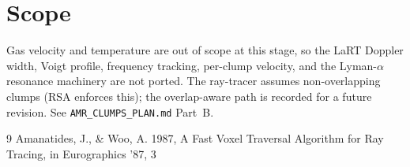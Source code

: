 \documentclass[english,a4paper]{kiseon_memo}
\begin{document}
\section{Scope}
Gas velocity and temperature are out of scope at this stage, so the LaRT
Doppler width, Voigt profile, frequency tracking, per-clump velocity, and the
Lyman-$\alpha$ resonance machinery are not ported.  The ray-tracer assumes
non-overlapping clumps (RSA enforces this); the overlap-aware path is recorded
for a future revision.  See \texttt{AMR\_CLUMPS\_PLAN.md} Part~B.

\begin{thebibliography}{9}
 Amanatides, J., \& Woo, A. 1987, A Fast Voxel Traversal
  Algorithm for Ray Tracing, in Eurographics '87, 3
\end{thebibliography}
\end{document}
